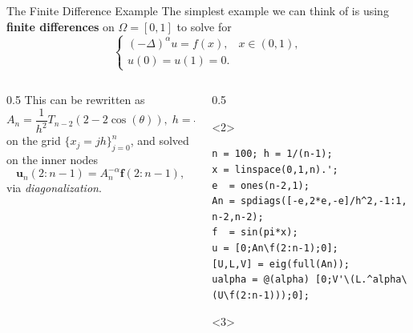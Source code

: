 \documentclass[aspectratio=169,xcolor=dvipsnames]{beamer}
\begin{document}
	\begin{frame}[fragile]{The Finite Difference Example}
	The simplest example we can think of is using \textbf{finite differences} on $\Omega = [0,1]$ to solve for
	\[
	\begin{cases}
		(-\Delta)^\alpha u = f(x), & x \in (0,1),\\
		u(0) = u(1) = 0.
	\end{cases}
	\]
	\begin{columns}
	\begin{column}{0.5\columnwidth}
	This can be rewritten as
	\[
	A_n = \frac{1}{h^2} T_{n-2}(2-2\cos(\theta)), \; h = \frac{1}{n-1},
	\]
	on the grid $\{x_j = jh\}_{j=0}^{n}$, and solved on the inner nodes
	\[
	\mathbf{u}_n(2:n-1) = A_n^{-\alpha} \mathbf{f}(2:n-1),
	\]
	via \emph{diagonalization}.
	\end{column}
	\begin{column}{0.5\columnwidth}
	\begin{onlyenv}
	\begin{verbatim}
n = 100; h = 1/(n-1);
x = linspace(0,1,n).';
e  = ones(n-2,1);
An = spdiags([-e,2*e,-e]/h^2,-1:1, n-2,n-2);
f  = sin(pi*x);
u = [0;An\f(2:n-1);0];
[U,L,V] = eig(full(An));
ualpha = @(alpha) [0;V'\(L.^alpha\(U\f(2:n-1)));0];
	\end{verbatim}
	\end{onlyenv}
\begin{onlyenv}<3>
\centering

\end{onlyenv}
	\end{column}
	\end{columns}
	\end{frame}
\end{document}
